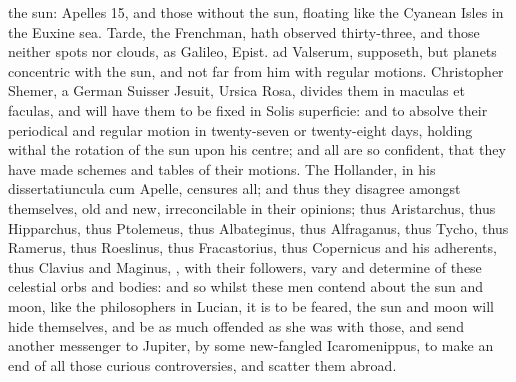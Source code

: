 {the sun: Apelles 15, and those without the sun, floating like the
Cyanean Isles in the Euxine sea. Tarde, the Frenchman, hath
observed thirty-three, and those neither spots nor clouds, as Galileo,
Epist. ad Valserum, supposeth, but planets concentric with the sun, and
not far from him with regular motions. Christopher Shemer, a
German Suisser Jesuit, Ursica Rosa, divides them in maculas et faculas,
and will have them to be fixed in Solis superficie: and to absolve
their periodical and regular motion in twenty-seven or twenty-eight
days, holding withal the rotation of the sun upon his centre; and all
are so confident, that they have made schemes and tables of their
motions. The Hollander, in his dissertatiuncula cum Apelle,
censures all; and thus they disagree amongst themselves, old and new,
irreconcilable in their opinions; thus Aristarchus, thus Hipparchus,
thus Ptolemeus, thus Albateginus, thus Alfraganus, thus Tycho, thus
Ramerus, thus Roeslinus, thus Fracastorius, thus Copernicus and his
adherents, thus Clavius and Maginus, \etc{}, with their followers, vary
and determine of these celestial orbs and bodies: and so whilst these
men contend about the sun and moon, like the philosophers in Lucian, it
is to be feared, the sun and moon will hide themselves, and be as much
offended as she was with those, and send another messenger to
Jupiter, by some new-fangled Icaromenippus, to make an end of all those
curious controversies, and scatter them abroad.

}
